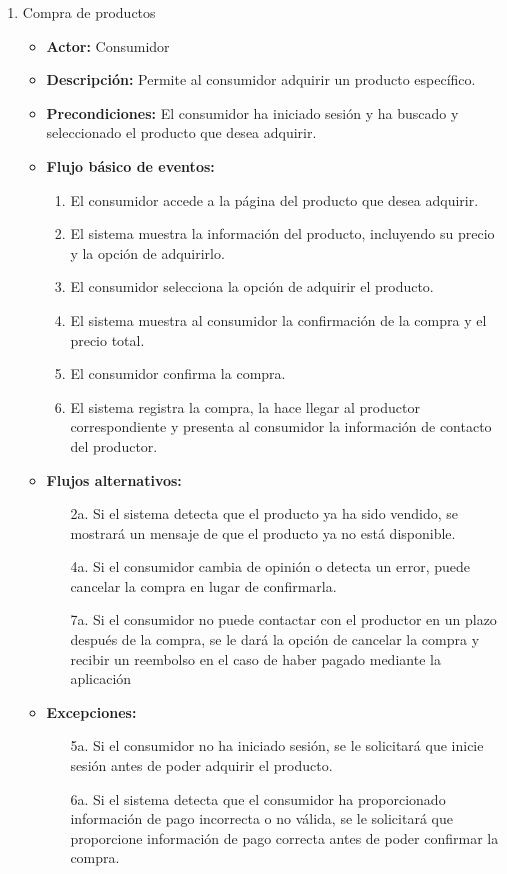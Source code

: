 \begin{enumerate}[CU-1:]
\item{Compra de productos}
\begin{itemize}
	\item \textbf{Actor:} Consumidor
	\item \textbf{Descripción:} Permite al consumidor adquirir un producto específico.
	\item \textbf{Precondiciones:} El consumidor ha iniciado sesión y ha buscado y seleccionado el producto que desea adquirir.
	\item \textbf{Flujo básico de eventos:}
	\begin{enumerate}[1:]
		\item El consumidor accede a la página del producto que desea adquirir.
		\item El sistema muestra la información del producto, incluyendo su precio y la opción de adquirirlo.
		\item El consumidor selecciona la opción de adquirir el producto.
		\item El sistema muestra al consumidor la confirmación de la compra y el precio total.
		\item El consumidor confirma la compra.
		\item El sistema registra la compra, la hace llegar al productor correspondiente y presenta al consumidor la información de contacto del productor.
		\end{enumerate}
	\item \textbf{Flujos alternativos:}
	\begin{enumerate}
		\item [2a.] Si el sistema detecta que el producto ya ha sido vendido, se mostrará un mensaje de que el producto ya no está disponible.
		\item [4a.] Si el consumidor cambia de opinión o detecta un error, puede cancelar la compra en lugar de confirmarla.
		\item [7a.] Si el consumidor no puede contactar con el productor en un plazo después de la compra, se le dará la opción de cancelar la compra y recibir un reembolso en el caso de haber pagado mediante la aplicación
		\end{enumerate}
	\item \textbf{Excepciones:}
	\begin{enumerate}
		\item[5a.] Si el consumidor no ha iniciado sesión, se le solicitará que inicie sesión antes de poder adquirir el producto.
		\item[6a.] Si el sistema detecta que el consumidor ha proporcionado información de pago incorrecta o no válida, se le solicitará que proporcione información de pago correcta antes de poder confirmar la compra.
		\end{enumerate}
\end{itemize}


\end{enumerate}
